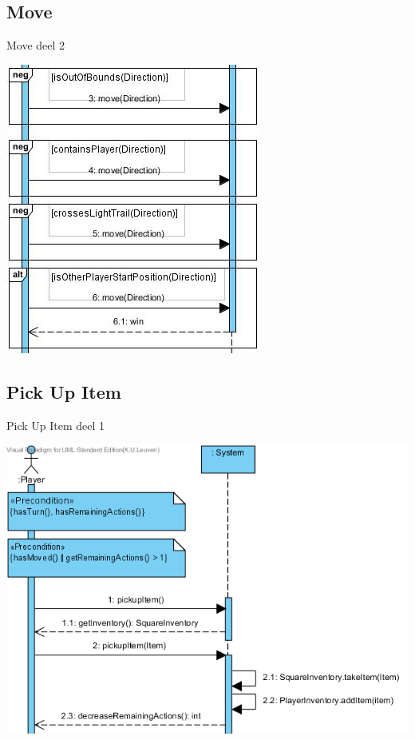 \documentclass[t]{beamer}
\begin{document}
\subsection{Move}
\begin{frame}{Move deel 2}
\begin{center}
\includegraphics[scale=0.7]{images/SSDMove2}
\end{center}
\end{frame}

\subsection{Pick Up Item}
\begin{frame}{Pick Up Item deel 1}
\begin{center}
\includegraphics[scale=0.55]{images/SSDPickUpItem1}
\end{center}
\end{frame}
\end{document}
